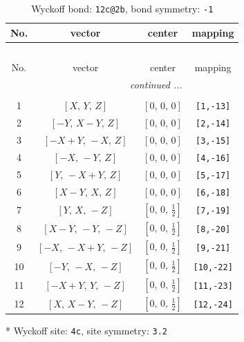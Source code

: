 \documentclass[fleqn,8pt]{jsarticle}
\begin{document}
\begin{longtable}{cccc}
\caption{Wyckoff bond: {\tt 12c@2b}, bond symmetry: {\tt -1}}
 \\
 \hline \hline
No. & vector & center & mapping \\ \hline \endfirsthead

\multicolumn{3}{l}{\tablename\ \thetable{}} \\
 \hline \hline
No. & vector & center & mapping \\ \hline \endhead

 \hline \hline
\multicolumn{3}{r}{\footnotesize\it continued ...} \\ \endfoot

 \hline \hline
\multicolumn{3}{r}{} \\ \endlastfoot

1 & $\left[ X,\, Y,\, Z \right]$ & $\left[ 0,\, 0,\, 0 \right]$ & {\tt [1,-13]} \\ \hline
2 & $\left[ - Y,\, X - Y,\, Z \right]$ & $\left[ 0,\, 0,\, 0 \right]$ & {\tt [2,-14]} \\ \hline
3 & $\left[ - X + Y,\, - X,\, Z \right]$ & $\left[ 0,\, 0,\, 0 \right]$ & {\tt [3,-15]} \\ \hline
4 & $\left[ - X,\, - Y,\, Z \right]$ & $\left[ 0,\, 0,\, 0 \right]$ & {\tt [4,-16]} \\ \hline
5 & $\left[ Y,\, - X + Y,\, Z \right]$ & $\left[ 0,\, 0,\, 0 \right]$ & {\tt [5,-17]} \\ \hline
6 & $\left[ X - Y,\, X,\, Z \right]$ & $\left[ 0,\, 0,\, 0 \right]$ & {\tt [6,-18]} \\ \hline
7 & $\left[ Y,\, X,\, - Z \right]$ & $\left[ 0,\, 0,\, \frac{1}{2} \right]$ & {\tt [7,-19]} \\ \hline
8 & $\left[ X - Y,\, - Y,\, - Z \right]$ & $\left[ 0,\, 0,\, \frac{1}{2} \right]$ & {\tt [8,-20]} \\ \hline
9 & $\left[ - X,\, - X + Y,\, - Z \right]$ & $\left[ 0,\, 0,\, \frac{1}{2} \right]$ & {\tt [9,-21]} \\ \hline
10 & $\left[ - Y,\, - X,\, - Z \right]$ & $\left[ 0,\, 0,\, \frac{1}{2} \right]$ & {\tt [10,-22]} \\ \hline
11 & $\left[ - X + Y,\, Y,\, - Z \right]$ & $\left[ 0,\, 0,\, \frac{1}{2} \right]$ & {\tt [11,-23]} \\ \hline
12 & $\left[ X,\, X - Y,\, - Z \right]$ & $\left[ 0,\, 0,\, \frac{1}{2} \right]$ & {\tt [12,-24]} \\
\end{longtable}
* Wyckoff site: {\tt 4c}, site symmetry: {\tt 3.2}
\end{document}
